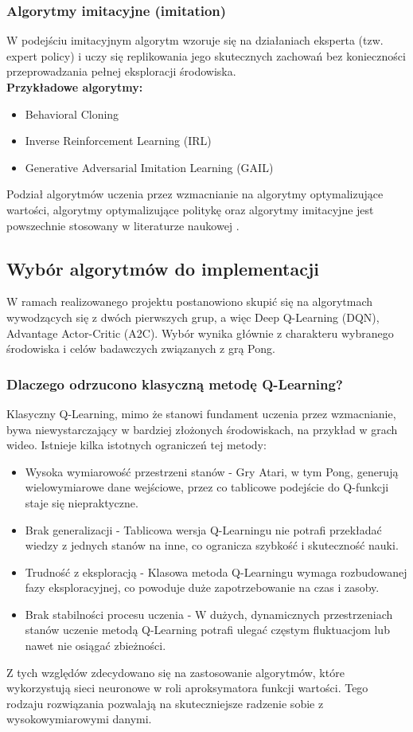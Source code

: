 \documentclass[a4paper, 12pt]{article}
\numberwithin{equation}{section}
\begin{document}
    \subsubsection{Algorytmy imitacyjne (imitation)}
    W podejściu imitacyjnym algorytm wzoruje się na działaniach eksperta (tzw. expert policy) i uczy się replikowania jego skutecznych zachowań bez konieczności przeprowadzania pełnej eksploracji środowiska.
    \\ \textbf{Przykładowe algorytmy:}
    \begin{itemize}
        \item Behavioral Cloning
        \item Inverse Reinforcement Learning (IRL)
        \item Generative Adversarial Imitation Learning (GAIL)
    \end{itemize}
    Podział algorytmów uczenia przez wzmacnianie na algorytmy optymalizujące wartości, algorytmy optymalizujące politykę oraz algorytmy imitacyjne jest powszechnie stosowany w literaturze naukowej \cite{sutton2018rl}.
    \subsection{Wybór algorytmów do implementacji}
    W ramach realizowanego projektu postanowiono skupić się na algorytmach wywodzących się z dwóch pierwszych grup, a więc Deep Q-Learning (DQN), Advantage Actor-Critic (A2C). Wybór wynika głównie z charakteru wybranego środowiska i celów badawczych związanych z grą Pong.
    \subsubsection{Dlaczego odrzucono klasyczną metodę Q-Learning?}
    Klasyczny Q-Learning, mimo że stanowi fundament uczenia przez wzmacnianie, bywa niewystarczający w bardziej złożonych środowiskach, na przykład w grach wideo. Istnieje kilka istotnych ograniczeń tej metody:
    \begin{itemize}
        \item Wysoka wymiarowość przestrzeni stanów - Gry Atari, w tym Pong, generują wielowymiarowe dane wejściowe, przez co tablicowe podejście do Q-funkcji staje się niepraktyczne.
        \item Brak generalizacji - Tablicowa wersja Q-Learningu nie potrafi przekładać wiedzy z jednych stanów na inne, co ogranicza szybkość i skuteczność nauki.
        \item Trudność z eksploracją - Klasowa metoda Q-Learningu wymaga rozbudowanej fazy eksploracyjnej, co powoduje duże zapotrzebowanie na czas i zasoby.
        \item Brak stabilności procesu uczenia - W dużych, dynamicznych przestrzeniach stanów uczenie metodą Q-Learning potrafi ulegać częstym fluktuacjom lub nawet nie osiągać zbieżności. 
    \end{itemize}
    Z tych względów zdecydowano się na zastosowanie algorytmów, które wykorzystują sieci neuronowe w roli aproksymatora funkcji wartości. Tego rodzaju rozwiązania pozwalają na skuteczniejsze radzenie sobie z wysokowymiarowymi danymi.
\end{document}
